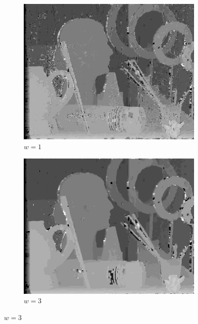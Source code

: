 \documentclass[letterpaper, 10 pt, conference]{ieeeconf}  %
\begin{document}
\begin{figure}[t]
        \centering
        \begin{subfigure}[b]{0.3\textwidth}
                \centering
                \includegraphics[width=\textwidth]{imgs/l4disparity-expansion-w1.png}
                \caption{$w=1$}
                \label{fig:trees}
        \end{subfigure}%
        
        \begin{subfigure}[b]{0.3\textwidth}
                \centering
                \includegraphics[width=\textwidth]{imgs/l4disparity-expansion-w3.png}
                \caption{$w=3$}
                \label{fig:farm}
        \end{subfigure}
        

\end{figure}
\end{document}
